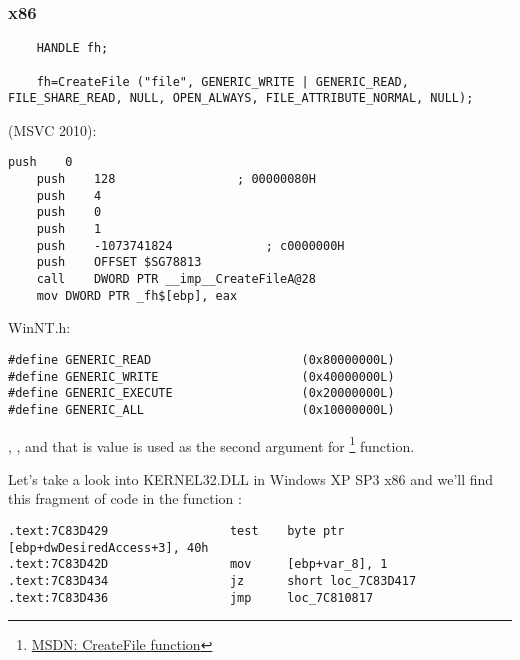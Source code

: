 \subsubsection{x86}


\begin{lstlisting}
	HANDLE fh;

	fh=CreateFile ("file", GENERIC_WRITE | GENERIC_READ, FILE_SHARE_READ, NULL, OPEN_ALWAYS, FILE_ATTRIBUTE_NORMAL, NULL);
\end{lstlisting}

 (MSVC 2010):

\begin{lstlisting}[caption=MSVC 2010]
	push	0
	push	128					; 00000080H
	push	4
	push	0
	push	1
	push	-1073741824				; c0000000H
	push	OFFSET $SG78813
	call	DWORD PTR __imp__CreateFileA@28
	mov	DWORD PTR _fh$[ebp], eax
\end{lstlisting}

 WinNT.h:

\begin{lstlisting}[caption=WinNT.h]
#define GENERIC_READ                     (0x80000000L)
#define GENERIC_WRITE                    (0x40000000L)
#define GENERIC_EXECUTE                  (0x20000000L)
#define GENERIC_ALL                      (0x10000000L)
\end{lstlisting}

, 
, 
{and that is value is used as the second argument for} \footnote{\href{http://msdn.microsoft.com/en-us/library/aa363858(VS.85).aspx}{MSDN: CreateFile function}} function.


{Let's take a look into KERNEL32.DLL in Windows XP SP3 x86 and we'll find
this fragment of code in the function :}

\begin{lstlisting}[caption=KERNEL32.DLL (Windows XP SP3 x86)]
.text:7C83D429                 test    byte ptr [ebp+dwDesiredAccess+3], 40h
.text:7C83D42D                 mov     [ebp+var_8], 1
.text:7C83D434                 jz      short loc_7C83D417
.text:7C83D436                 jmp     loc_7C810817
\end{lstlisting}

